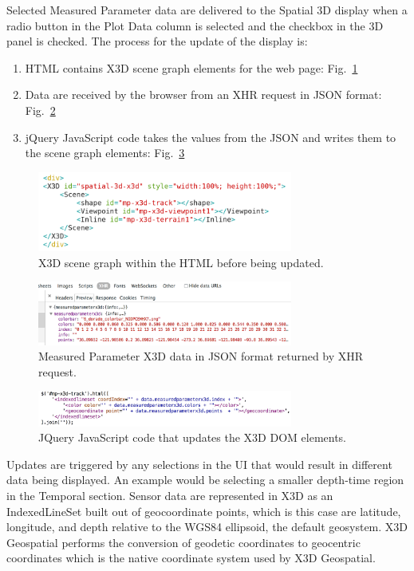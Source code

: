 \documentclass[conference]{IEEEtran}
\begin{document}
Selected Measured Parameter data are delivered to the Spatial 3D display when a radio button in the Plot Data column is selected and the checkbox in the 3D panel is checked. The process for the update of the display is:

\begin{enumerate}
\item HTML contains X3D scene graph elements for the web page: Fig.~\ref{fig:Spatial3D_DOM}
\item Data are received by the browser from an XHR request in JSON format: Fig.~\ref{fig:JSONData}
\item jQuery JavaScript code takes the values from the JSON and writes them to the scene graph elements: Fig.~\ref{fig:jQueryDOMUpdateGeo}
\end{enumerate}

\begin{figure}[!htbp]
\centering
\includegraphics[width=3.3in]{Spatial3D_DOM.png}
\caption{X3D scene graph within the HTML before being updated.}
\label{fig:Spatial3D_DOM}
\end{figure}

\begin{figure}[!htbp]
\centering
\includegraphics[width=3.3in]{JSONData.png}
\caption{Measured Parameter X3D data in JSON format returned by XHR request.}
\label{fig:JSONData}
\end{figure}

\begin{figure}[!htbp]
\centering
\includegraphics[width=3.3in]{jQueryDOMUpdateGeo.png}
\caption{JQuery JavaScript code that updates the X3D DOM elements.}
\label{fig:jQueryDOMUpdateGeo}
\end{figure}

Updates are triggered by any selections in the UI that would result in different data being displayed. An example would be selecting a smaller depth-time region in the Temporal section. Sensor data are represented in X3D as an IndexedLineSet built out of geocoordinate points, which is this case are latitude, longitude, and depth relative to the WGS84 ellipsoid, the default geosystem. X3D Geospatial performs the conversion of geodetic coordinates to geocentric coordinates which is the native coordinate system used by X3D Geospatial.
\end{document}
